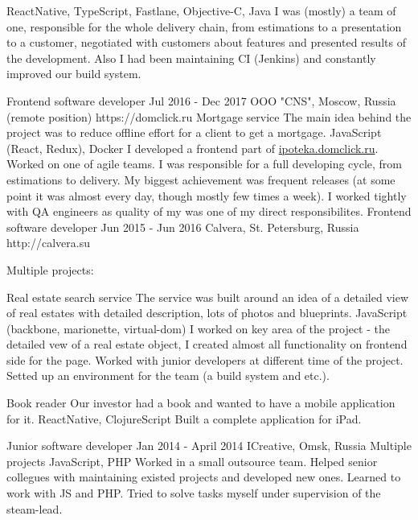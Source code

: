 \documentclass[11pt,a4paper,sans]{awesomecv}
\begin{document}
\begin{cventries}
{\begin{cvprojects}{0.8ex}
          {ReactNative, TypeScript, Fastlane, Objective-C, Java}
          {
            I was (mostly) a team of one, responsible for the whole delivery chain, from estimations to a presentation to a customer, 
            negotiated with customers about features and presented results of the development.
            Also I had been maintaining CI (Jenkins) and constantly improved our build system.
          }
      \end{cvprojects}
    }
\cventry
    {Frontend software developer}
    {Jul 2016 - Dec 2017}
    {OOO "CNS", Moscow, Russia (remote position)}
    {https://domclick.ru}
    {
      \cvproject
          {Mortgage service}
          {}
          {The main idea behind the project was to reduce offline effort for a client to get a mortgage.}
          {JavaScript (React, Redux), Docker}
          {
            I developed a frontend part of \href{http://ipoteka.domclick.ru}{ipoteka.domclick.ru}.
            Worked on one of agile teams.
            I was responsible for a full developing cycle, from estimations to delivery.
            My biggest achievement was frequent releases (at some point it was almost
            every day, though mostly few times a week).
            I worked tightly with QA engineers as quality of my was one of my direct responsibilites.
          }
    }
\cventry
    {Frontend software developer}
    {Jun 2015 - Jun 2016}
    {Calvera, St. Petersburg, Russia}
    {http://calvera.su}
    {
      Multiple projects:\newline
      \begin{cvprojects}{0.8ex}
        \item \cvproject
            {Real estate search service}
            {}
            {The service was built around an idea of a detailed view of real estates with detailed description, lots of photos and blueprints.}
            {JavaScript (backbone, marionette, virtual-dom)}
            {
              I worked on key area of the project - the detailed vew of a real estate object,
              I created almost all functionality on frontend side for the page.
              Worked with junior developers at different time of the project.
              Setted up an environment for the team (a build system and etc.).
            }
        \item \cvproject
            {Book reader}
            {}
            {Our investor had a book and wanted to have a mobile application for it.}
            {ReactNative, ClojureScript}
            {Built a complete application for iPad.}
      \end{cvprojects}
    }
\cventry
    {Junior software developer}
    {Jan 2014 - April 2014}
    {ICreative, Omsk, Russia}{}
    {
      Multiple projects\newline
      \vspace{0.8ex}
      \cvproject
          {}{}{}
          {JavaScript, PHP}
          {
            Worked in a small outsource team.
            Helped senior collegues with maintaining existed projects and developed new ones.
            Learned to work with JS and PHP. Tried to solve tasks myself under supervision of the steam-lead.
          }
    }
\end{cventries}
\end{document}
